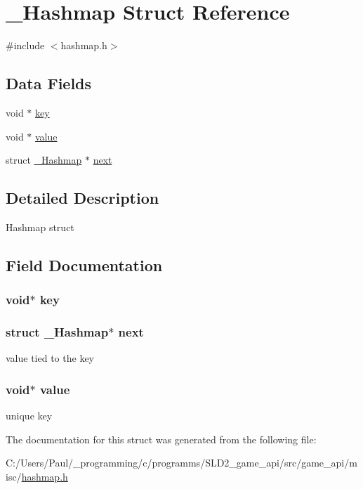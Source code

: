 \hypertarget{struct___hashmap}{\section{\+\_\+\+Hashmap Struct Reference}
\label{struct___hashmap}
}


{\ttfamily \#include $<$hashmap.\+h$>$}

\subsection*{Data Fields}
\begin{DoxyCompactItemize}
\item 
void $\ast$ \hyperlink{struct___hashmap_ab5c000aec752f2206131e183daf5efbf}{key}
\item 
void $\ast$ \hyperlink{struct___hashmap_a0f61d63b009d0880a89c843bd50d8d76}{value}
\item 
struct \hyperlink{struct___hashmap}{\+\_\+\+Hashmap} $\ast$ \hyperlink{struct___hashmap_afe8643b19e0dfa0caf6f55b466b0263f}{next}
\end{DoxyCompactItemize}


\subsection{Detailed Description}
Hashmap struct 

\subsection{Field Documentation}
\hypertarget{struct___hashmap_ab5c000aec752f2206131e183daf5efbf}{
\subsubsection[{key}]{\setlength{\rightskip}{0pt plus 5cm}void$\ast$ key}}\label{struct___hashmap_ab5c000aec752f2206131e183daf5efbf}
\hypertarget{struct___hashmap_afe8643b19e0dfa0caf6f55b466b0263f}{
\subsubsection[{next}]{\setlength{\rightskip}{0pt plus 5cm}struct {\bf \+\_\+\+Hashmap}$\ast$ next}}\label{struct___hashmap_afe8643b19e0dfa0caf6f55b466b0263f}
value tied to the key \hypertarget{struct___hashmap_a0f61d63b009d0880a89c843bd50d8d76}{
\subsubsection[{value}]{\setlength{\rightskip}{0pt plus 5cm}void$\ast$ value}}\label{struct___hashmap_a0f61d63b009d0880a89c843bd50d8d76}
unique key 

The documentation for this struct was generated from the following file\+:\begin{DoxyCompactItemize}
\item 
C\+:/\+Users/\+Paul/\+\_\+programming/c/programms/\+S\+L\+D2\+\_\+game\+\_\+api/src/game\+\_\+api/misc/\hyperlink{hashmap_8h}{hashmap.\+h}\end{DoxyCompactItemize}
